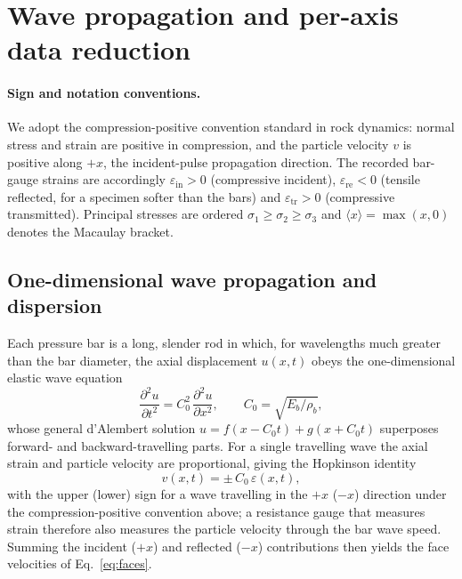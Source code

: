 \documentclass[sn-basic]{sn-jnl}
\newcommand{\Cz}{C_{0}}
\newcommand{\eps}{\varepsilon}
\begin{document}
\section{Wave propagation and per-axis data reduction}\label{sec:reduction}

\paragraph{Sign and notation conventions.} We adopt the compression-positive
convention standard in rock dynamics: normal stress and strain are positive in
compression, and the particle velocity $v$ is positive along $+x$, the
incident-pulse propagation direction. The recorded bar-gauge strains are
accordingly $\eps_{\mathrm{in}}>0$ (compressive incident), $\eps_{\mathrm{re}}<0$
(tensile reflected, for a specimen softer than the bars) and
$\eps_{\mathrm{tr}}>0$ (compressive transmitted). Principal stresses are ordered
$\sigma_1\ge\sigma_2\ge\sigma_3$ and $\langle x\rangle=\max(x,0)$ denotes the
Macaulay bracket.

\subsection{One-dimensional wave propagation and dispersion}\label{sec:wave}

Each pressure bar is a long, slender rod in which, for wavelengths much greater
than the bar diameter, the axial displacement $u(x,t)$ obeys the
one-dimensional elastic wave equation
\begin{equation}
\frac{\partial^2 u}{\partial t^2}=\Cz^2\,\frac{\partial^2 u}{\partial x^2},
\qquad \Cz=\sqrt{E_b/\rho_b},
\label{eq:wave}
\end{equation}
whose general d'Alembert solution $u=f(x-\Cz t)+g(x+\Cz t)$ superposes
forward- and backward-travelling parts. For a single travelling wave the axial
strain and particle velocity are proportional, giving the Hopkinson identity
\begin{equation}
v(x,t)=\pm\,\Cz\,\eps(x,t),
\label{eq:hopkinson}
\end{equation}
with the upper (lower) sign for a wave travelling in the $+x$ ($-x$) direction
under the compression-positive convention above; a resistance gauge that measures
strain therefore also measures the particle velocity through the bar wave speed.
Summing the incident ($+x$) and reflected ($-x$) contributions then yields the
face velocities of Eq.~\eqref{eq:faces}.
\end{document}
